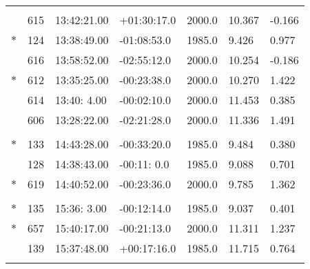 \documentclass[10pt]{report}
\renewcommand{\[}{\begin{eqnarray}}
\renewcommand{\]}{\end{eqnarray}}
\begin{document}
\begin{tabular}{lllllll}
\multicolumn{7}{l}{ }\\
 &615&13:42:21.00&+01:30:17.0&2000.0 & 10.367 & -0.166 \\
$\ast$&124&13:38:49.00&-01:08:53.0&1985.0 &  9.426 &  0.977 \\
 &616&13:58:52.00&-02:55:12.0&2000.0 & 10.254 & -0.186 \\
$\ast$&612&13:35:25.00&-00:23:38.0&2000.0 & 10.270 &  1.422 \\
 &614&13:40: 4.00&-00:02:10.0&2000.0 & 11.453 &  0.385 \\
 &606&13:28:22.00&-02:21:28.0&2000.0 & 11.336 &  1.491 \\
\multicolumn{7}{l}{ }\\
$\ast$&133&14:43:28.00&-00:33:20.0&1985.0 &  9.484 &  0.380 \\
 &128&14:38:43.00&-00:11: 0.0&1985.0 &  9.088 &  0.701  \\
$\ast$&619&14:40:52.00&-00:23:36.0&2000.0 &  9.785 &  1.362  \\
\multicolumn{7}{l}{ }\\
$\ast$&135&15:36: 3.00&-00:12:14.0&1985.0 &  9.037 &  0.401  \\
$\ast$&657&15:40:17.00&-00:21:13.0&2000.0 & 11.311 &  1.237  \\
 &139&15:37:48.00&+00:17:16.0&1985.0 & 11.715 &  0.764  \\
\multicolumn{7}{l}{ }
\end{tabular}
\pagebreak
\end{document}

